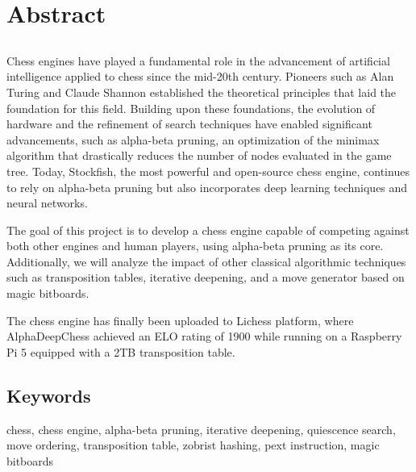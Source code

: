 \chapter*{Abstract}

\section*{\tituloPortadaEngVal}

Chess engines have played a fundamental role in the advancement of artificial intelligence applied to chess since the mid-20th century. Pioneers such as Alan Turing and Claude Shannon established the theoretical principles that laid the foundation for this field. Building upon these foundations, the evolution of hardware and the refinement of search techniques have enabled significant advancements, such as alpha-beta pruning, an optimization of the minimax algorithm that drastically reduces the number of nodes evaluated in the game tree. Today, Stockfish, the most powerful and open-source chess engine, continues to rely on alpha-beta pruning but also incorporates deep learning techniques and neural networks.

\vspace{1em}

The goal of this project is to develop a chess engine capable of competing against both other engines and human players, using alpha-beta pruning as its core. Additionally, we will analyze the impact of other classical algorithmic techniques such as transposition tables, iterative deepening, and a move generator based on magic bitboards.

\vspace{1em}

The chess engine has finally been uploaded to Lichess platform, where AlphaDeepChess achieved an ELO rating of 1900 while running on a Raspberry Pi 5 equipped with a 2TB transposition table.

\section*{Keywords}

\noindent chess, chess engine, alpha-beta pruning, iterative deepening, quiescence search, move ordering, transposition table, zobrist hashing, pext instruction, magic bitboards
